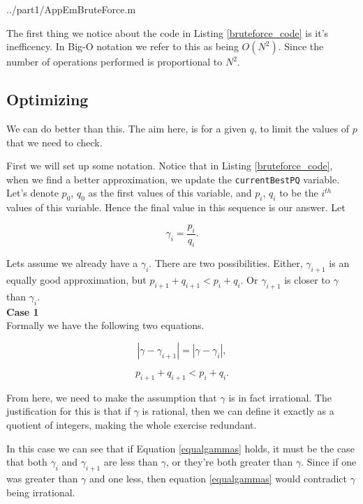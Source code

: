 \documentclass[10pt]{article}
\newcommand*{\gam}{$\gamma$}
\newcommand*{\gami}{$\gamma_{i}$}
\begin{document}
   {../part1/AppEmBruteForce.m}

The first thing we notice about the code in Listing \ref{bruteforce_code} is it's inefficency. In Big-O notation we refer to this as being $O(N^2)$. Since the number of operations performed is proportional to $N^2$.

\subsection{Optimizing}
We can do better than this. The aim here, is for a given $q$, to limit the values of $p$ that we need to check. 

First we will set up some notation. Notice that in Listing \ref{bruteforce_code}, when we find a better approximation, we update the \texttt{currentBestPQ} variable. Let's denote $p_0$, $q_0$  as the first values of this variable, and $p_i$, $q_i$ to be the $i^{th}$ values of this variable. Hence the final value in this sequence is our answer. Let

\begin{equation} \label{defgammai}
  \gamma_i = \frac{p_i}{q_i}.
\end{equation}


Lets assume we already have a \gami.  There are two possibilities. Either, $\gamma_{i+1}$ is an equally good approximation, but  $p_{i+1} + q_{i+1} < p_i + q_i$. Or $\gamma_{i+1}$ is closer to $\gamma$ than \gami. \\

\noindent \textbf{Case 1 } \\

Formally we have the following two equations.

\begin{equation}\label{equalgammas}
|\gamma- \gamma_{i+1}| = |\gamma - \gamma_{i}| ,
\end{equation}

\begin{equation} \label{contradiction}
p_{i+1} + q_{i+1} < p_i + q_i.
\end{equation}

From here, we need to make the assumption that $\gamma$ is in fact irrational. The justification for this is that if $\gamma$ is rational, then we can define it exactly as a quotient of integers, making the whole exercise redundant. 

In this case we can see that if Equation \ref{equalgammas} holds, it must be the case that both $\gamma_{i}$ and $\gamma_{i+1}$ are less than \gam, or they're both greater than $\gamma$. Since if one was greater than $\gamma$ and one less, then equation  \ref{equalgammas} would contradict $\gamma$ being irrational.
\end{document}
